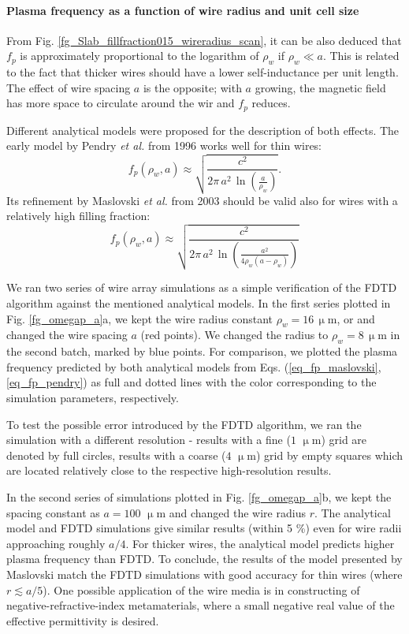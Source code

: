\paragraph{Plasma frequency as a function of wire radius and unit cell size}%
From Fig.  \ref{fg_Slab_fillfraction015_wireradius_scan}, it can be also deduced that $f_p$ is approximately proportional to the logarithm of $\rho_w$ if $\rho_w \ll a$. This is related to the fact that thicker wires should have a lower self-inductance per unit length. 
The effect of wire spacing $a$ is the opposite; with $a$ growing, the magnetic field has more space to circulate around the wir and $f_p$ reduces. 

Different analytical models were proposed for the description of both effects. The early model by Pendry \textit{et al.} from 1996 \cite{pendry1996extremely} works well for thin wires: 
\begin{equation} f_p(\rho_w,a) \approx \sqrt{\frac{c^2}{2\pi \, a^2 \, \ln(\frac{a}{\rho_w})}}. \label{eq_fp_pendry}\end{equation}
Its refinement by Maslovski \textit{et al.} from 2003 \cite{maslovski2002wire} should be valid also for wires with a relatively high filling fraction:
\begin{equation} f_p(\rho_w,a) \approx \sqrt{\frac{c^2}{2\pi \, a^2 \, \ln\left(\frac{a^2}{4\rho_w (a-\rho_w)}\right)}} \label{eq_fp_maslovski}\end{equation}

We ran two series of wire array simulations as a simple verification of the FDTD algorithm against the mentioned analytical models. In the first series plotted in Fig. \ref{fg_omegap_a}a, we kept the wire radius constant $\rho_w = 16\,\upmu$m, or and changed the wire spacing $a$ (red points). We changed the radius to $\rho_w = 8\,\upmu$m in the second batch, marked by blue points. For comparison, we plotted the plasma frequency predicted by both analytical models from Eqs. (\ref{eq_fp_maslovski}, \ref{eq_fp_pendry}) as full and dotted lines with the color corresponding to the simulation parameters, respectively. 

To test the possible error introduced by the FDTD algorithm, we ran the simulation with a different resolution - results with a fine ($1$ $\upmu$m) grid are denoted by full circles, results with a coarse ($4$ $\upmu$m) grid by empty squares which are located relatively close to the respective high-resolution results.

In the second series of simulations plotted in Fig.  \ref{fg_omegap_a}b, we kept the spacing constant as $a = 100$ $\upmu$m and changed the wire radius $r$. The analytical model and FDTD simulations give similar results (within 5 \%) even for wire radii approaching roughly $a/4$. For thicker wires, the analytical model predicts higher plasma frequency than FDTD.  To conclude, the results of the model presented by Maslovski match the FDTD simulations with good accuracy for thin wires (where $r \lesssim a/5$). One possible application of the wire media is in constructing of negative-refractive-index metamaterials, where a small negative real value of the effective permittivity is desired.%

